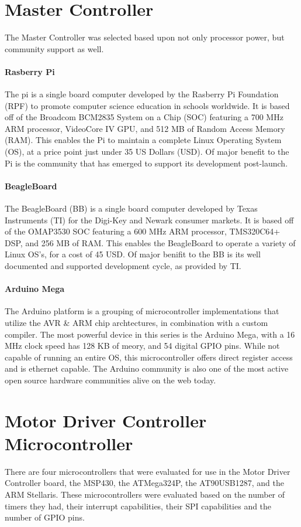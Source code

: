 \section{Master Controller}
The Master Controller  was selected based upon not only processor power, but community support as well. 

\paragraph{Rasberry Pi}
The \gls{pi} is a single board computer developed by the Rasberry Pi Foundation (RPF) to promote computer science education in schools worldwide.
It is based off of the Broadcom BCM2835 System on a Chip (SOC) featuring a 700 MHz ARM processor, VideoCore IV GPU, and 512 MB of Random Access Memory (RAM).
This enables the Pi to maintain a complete Linux Operating System (OS), at a price point just under 35 US Dollars (USD).
Of major benefit to the Pi is the community that has emerged to support its development post-launch.

\paragraph{BeagleBoard}
The BeagleBoard (BB) is a single board computer developed by Texas Instruments (TI) for the Digi-Key and Newark consumer markets.
It is based off of the OMAP3530 SOC featuring a 600 MHz ARM processor, TMS320C64+ DSP, and 256 MB of RAM.
This enables the BeagleBoard to operate a variety of Linux OS’s, for a cost of 45 USD.
Of major beniﬁt to the BB is its well documented and supported development cycle, as provided by TI.

\paragraph{Arduino Mega}
The Arduino platform is a grouping of microcontroller implementations that utilize the AVR \& ARM chip archtectures, in combination with a custom compiler.
The most powerful device in this series is the Arduino Mega, with a 16 MHz clock speed has 128 KB of meory, and 54 digital GPIO pins.
While not capable of running an entire OS, this microcontroller offers direct register access and is ethernet capable.
The Arduino community is also one of the most active open source hardware communities alive on the web today.


\section{Motor Driver Controller Microcontroller}
There are four microcontrollers that were evaluated for use in the Motor Driver Controller board, the MSP430, the ATMega324P, the AT90USB1287, and the ARM Stellaris.
These microcontrollers were evaluated based on the number of timers they had, their interrupt capabilities, their SPI capabilities and the number of GPIO pins.

